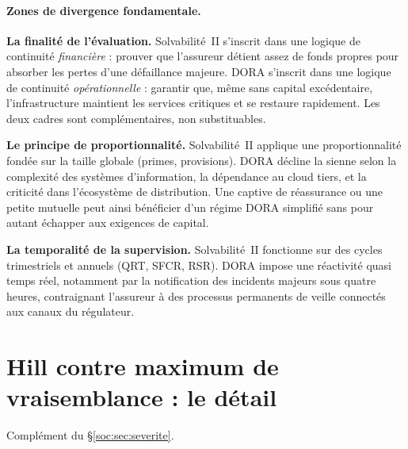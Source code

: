 \paragraph{Zones de divergence fondamentale.}
\textbf{La finalité de l'évaluation.} Solvabilité~II s'inscrit dans une logique de
continuité \emph{financière} : prouver que l'assureur détient assez de fonds propres pour
absorber les pertes d'une défaillance majeure. DORA s'inscrit dans une logique de
continuité \emph{opérationnelle} : garantir que, même sans capital excédentaire,
l'infrastructure maintient les services critiques et se restaure rapidement. Les deux
cadres sont complémentaires, non substituables.

\textbf{Le principe de proportionnalité.} Solvabilité~II applique une proportionnalité
fondée sur la taille globale (primes, provisions). DORA décline la sienne selon la
complexité des systèmes d'information, la dépendance au cloud tiers, et la criticité dans
l'écosystème de distribution. Une captive de réassurance ou une petite mutuelle peut ainsi
bénéficier d'un régime DORA simplifié sans pour autant échapper aux exigences de capital.

\textbf{La temporalité de la supervision.} Solvabilité~II fonctionne sur des cycles
trimestriels et annuels (QRT, SFCR, RSR). DORA impose une réactivité quasi temps réel,
notamment par la notification des incidents majeurs sous quatre heures, contraignant
l'assureur à des processus permanents de veille connectés aux canaux du régulateur.

\section{Hill contre maximum de vraisemblance : le détail}
\label{sec:ann-hill}


Complément du \S\ref{soc:sec:severite}.

